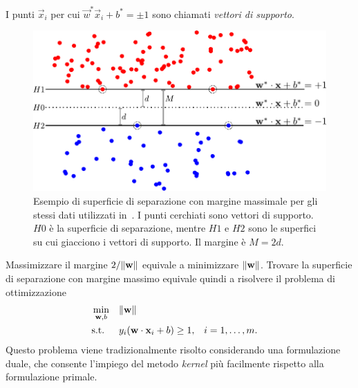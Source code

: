 I punti $\Vec{x}_i$ per cui $\Vec{w}^*\Vec{x}_i + b^* = \pm 1$ sono chiamati \emph{vettori di supporto}.
\begin{figure}
    \centering
    \includegraphics[width=0.7\linewidth]{img/margine_separazione.pdf}
    \caption{Esempio di superficie di separazione con margine massimale per gli stessi dati utilizzati in~. I punti cerchiati sono vettori di supporto. $H0$ è la superficie di separazione, mentre $H1$ e $H2$ sono le superfici su cui giacciono i vettori di supporto. Il margine è $M=2d$.}
    \label{fig:optimal_separation_margin}
\end{figure}
%
Massimizzare il margine $2/\norm{\vec{w}}$ equivale a minimizzare $\norm{\Vec{w}}$. 
Trovare la superficie di separazione con margine massimo equivale quindi a risolvere il problema di ottimizzazione
\begin{equation}
\label{eq:svc:hardmargin:primal}
\begin{aligned}
& \min_{\Vec{w},b} && \norm{\Vec{w}} \\
& \textrm{s.t.} && y_i(\Vec{w}\cdot \Vec{x}_i + b) \geq 1, && i=1,\dots,m. \\
\end{aligned}
\end{equation}
Questo problema viene tradizionalmente risolto considerando una formulazione duale, che consente l'impiego del metodo \emph{kernel} più facilmente rispetto alla formulazione primale.

